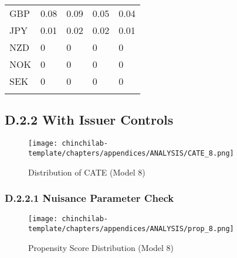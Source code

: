 \begin{table}[H]
\begin{tabular}{lllll}
GBP & \cellcolor[HTML]{EEF7F3}0.08 & \cellcolor[HTML]{ECF6F2}0.09 & \cellcolor[HTML]{F3F9F8}0.05 & \cellcolor[HTML]{F5FAF9}0.04 \\
JPY & \cellcolor[HTML]{FBFCFE}0.01 & \cellcolor[HTML]{F9FBFC}0.02 & \cellcolor[HTML]{F9FBFC}0.02 & \cellcolor[HTML]{FBFCFE}0.01 \\
NZD & \cellcolor[HTML]{FCFCFF}0 & \cellcolor[HTML]{FCFCFF}0 & \cellcolor[HTML]{FCFCFF}0 & \cellcolor[HTML]{FCFCFF}0 \\
NOK & \cellcolor[HTML]{FCFCFF}0 & \cellcolor[HTML]{FCFCFF}0 & \cellcolor[HTML]{FCFCFF}0 & \cellcolor[HTML]{FCFCFF}0 \\
SEK & \cellcolor[HTML]{FCFCFF}0 & \cellcolor[HTML]{FCFCFF}0 & \cellcolor[HTML]{FCFCFF}0 & \cellcolor[HTML]{FCFCFF}0 \\
\hline \\[-1.8ex] 
\end{tabular}
\end{table}

\newpage

\subsection{D.2.2 With Issuer Controls}

\begin{figure}[H]
    \centering
    \texttt{[image: chinchilab-template/chapters/appendices/ANALYSIS/CATE\_8.png]}
    \caption{Distribution of CATE (Model 8)}
    \label{fig:my_label}
\end{figure}

\subsubsection{D.2.2.1 Nuisance Parameter Check}
\begin{figure}[H]
    \centering
    \texttt{[image: chinchilab-template/chapters/appendices/ANALYSIS/prop\_8.png]}
    \caption{Propensity Score Distribution (Model 8)}
    \label{fig:my_label}
\end{figure}

